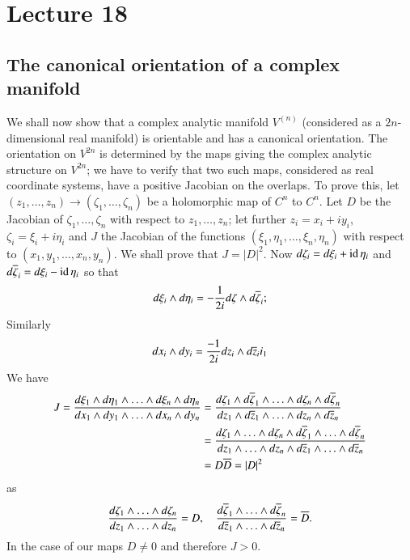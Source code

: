 \chapter{Lecture 18}

\section*{The canonical orientation of a complex
  manifold}\pageoriginale

We shall now show that a complex analytic manifold $V^{(n)}$
(considered as a $2n$-dimensional real manifold) is orientable and has
a canonical orientation. The orientation on $V^{2n}$ is determined by
the maps giving the complex analytic structure on $V^{2n}$; we have to
verify that two such maps, considered as real coordinate systems, have
a positive Jacobian on the overlaps. To prove this, let
$(z_{1},\ldots,z_{n})\to (\zeta_{1},\ldots,\zeta_{n})$ be a
holomorphic map of $C^{n}$ to $C^{n}$. Let $D$ be the Jacobian of
$\zeta_{1},\ldots,\zeta_{n}$ with respect to $z_{1},\ldots,z_{n}$; let
further $z_{i}=x_{i}+iy_{i}$, $\zeta_{i}=\xi_{i}+i\eta_{i}$ and $J$
the Jacobian of the functions $(\xi_1,\eta_{1},\ldots,\xi_{n},\eta_{n})$
with respect to $(x_{1},y_{1},\ldots,x_{n},y_{n})$. We shall prove
that $J=|D|^{2}$. Now $d\zeta_{i}=d\xi_{i}+\operatorname{id}\eta_{i}$ and
$d\overline{\zeta}_{i}=d\xi_{i}-\operatorname{id}\eta_{i}$ so that
$$
d\xi_{i}\wedge d\eta_{i}=-\frac{1}{2i}d\zeta\wedge d\overline{\zeta}_{i};
$$
Similarly
$$
dx_{i}\wedge dy_{i}=\frac{-1}{2i}dz_{i}\wedge d\overline{z}_{i}i_{1}
$$
We have
\begin{align*}
J=\frac{d\xi_{1}\wedge d\eta_{1}\wedge\ldots\wedge d\xi_{n}\wedge
  d\eta_{n}}{dx_{1}\wedge dy_{1}\wedge\ldots\wedge dx_{n}\wedge
  dy_{n}} &=
\frac{d\zeta_{1}\wedge d\overline{\zeta}_{1}\wedge\ldots\wedge
  d\zeta_{n}\wedge d\overline{\zeta}_{n}}{dz_{1}\wedge
  d\overline{z}_{1}\wedge\ldots\wedge dz_{n}\wedge d\overline{z}_{n}}\\
&= \frac{d\zeta_{1}\wedge\ldots\wedge d\zeta_{n}\wedge
  d\overline{\zeta}_{1}\wedge\ldots\wedge
  d\overline{\zeta}_{n}}{dz_{1}\wedge\ldots\wedge dz_{n}\wedge
  d\overline{z}_{1}\wedge\ldots\wedge d\overline{z}_{n}}\\
&= D\overline{D}=|D|^{2}
\end{align*}\pageoriginale
as
$$
\frac{d\zeta_{1}\wedge\ldots\wedge
  d\zeta_{n}}{dz_{1}\wedge\ldots\wedge dz_{n}}=D,\quad
\frac{d\overline{\zeta}_{1}\wedge\ldots\wedge
  d\overline{\zeta}_{n}}{d\overline{z}_{1}\wedge\ldots\wedge d\overline{z}_{n}}=\overline{D}. 
$$
In the case of our maps $D\neq 0$ and therefore $J>0$.

